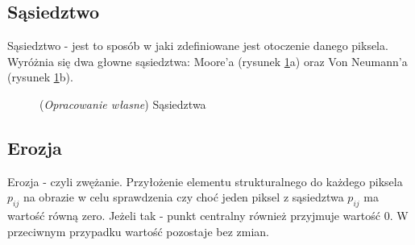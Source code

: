 \documentclass{article}
\begin{document}
        \subsection{Sąsiedztwo}
        {
            \label{sec:sasiedztwo}
            \Large
            \justifying
            \quad
            Sąsiedztwo - jest to sposób w jaki zdefiniowane jest otoczenie danego piksela.
            Wyróżnia się dwa głowne sąsiedztwa: Moore'a (rysunek \ref{neighbourhood}a) oraz Von Neumann'a (rysunek \ref{neighbourhood}b).
        }
        \begin{figure}[H]
            \centering
            \qquad
            \caption{(\textit{Opracowanie własne}) Sąsiedztwa}
            \label{neighbourhood}
        \end{figure}

        \subsection{Erozja}
        {
            \label{sec:erozja}
            \Large
            \justifying
            \quad
            Erozja - czyli zwężanie.
            Przyłożenie elementu strukturalnego do każdego piksela \(p_{ij}\) na obrazie w celu sprawdzenia czy choć jeden piksel z sąsiedztwa \(p_{ij}\) ma wartość równą zero.
            Jeżeli tak - punkt centralny również przyjmuje wartość 0. W przeciwnym przypadku wartość pozostaje bez zmian.
        }
\end{document}
